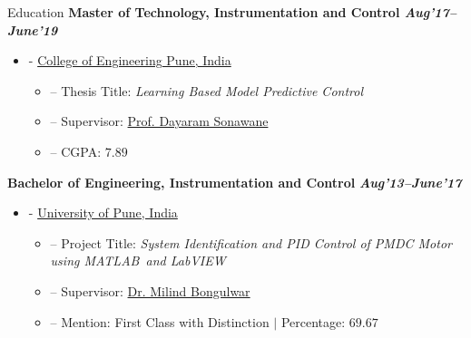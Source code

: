 \documentclass[11pt]{resume}
\newcommand{\mt}{\textsc{MATLAB}}
\newenvironment{outerlist}[1][\enskip\textbullet]%
{\begin{itemize}[#1,leftmargin=*]}{\end{itemize}%
	\vspace{-.5\baselineskip}}
\newenvironment{innerlist}[1][\enskip\textbullet]%
{\begin{itemize}[#1,leftmargin=*,parsep=0pt,itemsep=0pt,topsep=0pt,partopsep=0pt]}
	{\end{itemize}}
\begin{document}
\begin{rSection}{Education}
{\bf{Master of Technology, Instrumentation and Control} \hfill {\textit{Aug'17--June'19}}}
\begin{outerlist}
	\item[-]  \href{http://www.coep.org.in/} {College of Engineering Pune, India}
	\begin{innerlist}
		\item[--] Thesis Title: \textit{Learning Based Model Predictive Control}
		\item[--] Supervisor: \href{http://www.coep.org.in/mycoep/dnsinstrucoepacin} {Prof. Dayaram Sonawane}
		\item[--] CGPA: $ 7.89 $
	\end{innerlist}
\end{outerlist}
\vspace{.1in}
\textbf{{Bachelor of Engineering, Instrumentation and Control}} \hfill \textit{\textbf{Aug'13--June'17}}
\begin{outerlist}
	\item[-]  \href{http://www.unipune.ac.in/} {University of Pune, India}	
	\begin{innerlist}
		\item[--] Project Title: \textit{System Identification and PID Control of PMDC Motor using \mt~and LabVIEW}
		\item[--] Supervisor: \href{http://www.gcoeara.ac.in/Instrumentation-control-about-us.php} {Dr. Milind Bongulwar}
		\item[--] Mention:  First Class with Distinction $ \vert $ Percentage: $69.67$
	\end{innerlist}
\end{outerlist}
\end{rSection}
\vspace{5mm}
\end{document}
